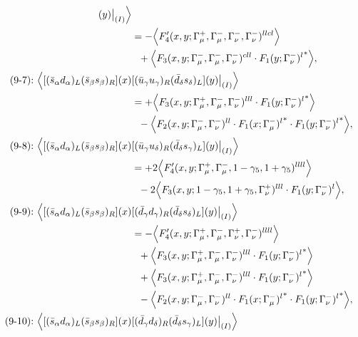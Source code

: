 \begin{align}
[(\bar c_\gamma c_\delta)_L(\bar d_\delta s_\gamma)_L](y)\big|_{(I)}
\Big\rangle
\notag\\*
&=
 - \Big\langle F_4'(x,y;\Gamma_\mu^+,\Gamma_\mu^-,\Gamma_\nu^-,\Gamma_\nu^-)^{llcl}\Big\rangle
\notag\\*&\ \ 
 + \Big\langle F_3(x,y;\Gamma_\mu^-,\Gamma_\mu^-,\Gamma_\nu^-)^{cll} \cdot {F_1(y;\Gamma_\nu^-)^l}^*\Big\rangle,
\\
\mbox{(9-7):}\ 
\Big\langle
[(\bar s_\alpha d_\alpha)_L(\bar s_\beta s_\beta)_R](x)&
[(\bar u_\gamma u_\gamma)_R(\bar d_\delta s_\delta)_L](y)\big|_{(I)}
\Big\rangle
\notag\\*
&=
 + \Big\langle F_3(x,y;\Gamma_\mu^+,\Gamma_\mu^-,\Gamma_\nu^-)^{lll} \cdot {F_1(y;\Gamma_\nu^-)^l}^*\Big\rangle
\notag\\*&\ \ 
 - \Big\langle F_2(x,y;\Gamma_\mu^-,\Gamma_\nu^-)^{ll} \cdot {F_1(x;\Gamma_\mu^-)^l}^* \cdot {F_1(y;\Gamma_\nu^-)^l}^*\Big\rangle,
\\
\mbox{(9-8):}\ 
\Big\langle
[(\bar s_\alpha d_\alpha)_L(\bar s_\beta s_\beta)_R](x)&
[(\bar u_\gamma u_\delta)_R(\bar d_\delta s_\gamma)_L](y)\big|_{(I)}
\Big\rangle
\notag\\*
&=
 + 2\Big\langle F_4'(x,y;\Gamma_\mu^+,\Gamma_\mu^-,1-\gamma_5,1+\gamma_5)^{llll}\Big\rangle
\notag\\*&\ \ 
-2\Big\langle F_3(x,y;1-\gamma_5,1+\gamma_5,\Gamma_\nu^+)^{lll} \cdot F_1(y;\Gamma_\nu^-)^l\Big\rangle,
\\
\mbox{(9-9):}\ 
\Big\langle
[(\bar s_\alpha d_\alpha)_L(\bar s_\beta s_\beta)_R](x)&
[(\bar d_\gamma d_\gamma)_R(\bar d_\delta s_\delta)_L](y)\big|_{(I)}
\Big\rangle
\notag\\*
&=
 - \Big\langle F_4'(x,y;\Gamma_\mu^+,\Gamma_\mu^-,\Gamma_\nu^+,\Gamma_\nu^-)^{llll}\Big\rangle
\notag\\*&\ \ 
 + \Big\langle F_3(x,y;\Gamma_\mu^+,\Gamma_\mu^-,\Gamma_\nu^-)^{lll} \cdot {F_1(y;\Gamma_\nu^-)^l}^*\Big\rangle
\notag\\*&\ \ 
 + \Big\langle F_3(x,y;\Gamma_\mu^+,\Gamma_\mu^-,\Gamma_\nu^-)^{lll} \cdot {F_1(y;\Gamma_\nu^-)^l}^*\Big\rangle
\notag\\*&\ \ 
 - \Big\langle F_2(x,y;\Gamma_\mu^-,\Gamma_\nu^-)^{ll} \cdot {F_1(x;\Gamma_\mu^-)^l}^* \cdot {F_1(y;\Gamma_\nu^-)^l}^*\Big\rangle,
\\
\mbox{(9-10):}\ 
\Big\langle
[(\bar s_\alpha d_\alpha)_L(\bar s_\beta s_\beta)_R](x)&
[(\bar d_\gamma d_\delta)_R(\bar d_\delta s_\gamma)_L](y)\big|_{(I)}
\Big\rangle
\notag\\*

\end{align}
